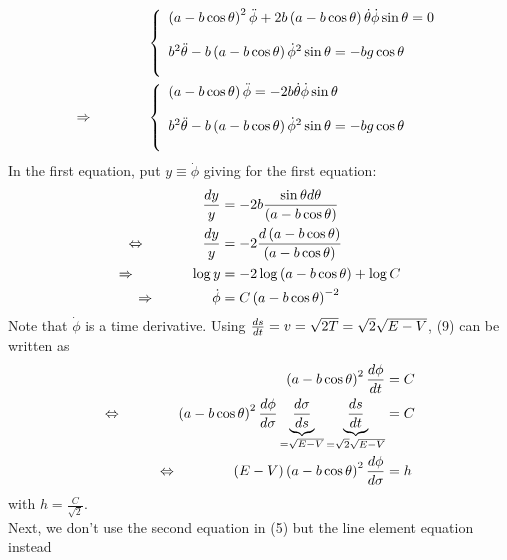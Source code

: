 \begin{align} 
&\left\{\begin{array}{l}
\left(a-b\cos \theta \right)^2   \ddot{\phi}+2b\left(a-b\cos \theta \right)\dot{\theta} \dot{\phi}\sin \theta  =0\\\\
b^2\ddot{\theta}-b\left(a-b\cos \theta \right)\dot{\phi}^2\sin \theta=-bg\cos{\theta}\\\\
\end{array}\right.\\
\Rightarrow\quad\quad\quad\quad &\left\{\begin{array}{l}
\left(a-b\cos \theta \right)   \ddot{\phi}=-2b\dot{\theta} \dot{\phi}\sin \theta  \\\\
b^2\ddot{\theta}-b\left(a-b\cos \theta \right)\dot{\phi}^2\sin \theta=-bg\cos{\theta}\\\\
\end{array}\right.
\end{align}
In the first equation, put $y \equiv \dot{\phi}$ giving for the first equation:
\begin{align}
\frac{dy}{y}&=-2b \frac{\sin \theta d\theta} {\left(a-b\cos \theta \right)}  \\
\Leftrightarrow\quad\quad\quad\quad\frac{dy}{y}&=-2 \frac{d\left(a-b\cos \theta \right)} {\left(a-b\cos \theta \right)}\\
\Rightarrow \quad\quad\quad\quad \log y&=-2 \log \left(a-b\cos \theta \right)+\log C^{}\\
\Rightarrow \quad\quad\quad\quad \dot{\phi}&= C \left(a-b\cos \theta \right)^{-2}
\end{align}
Note that $\dot{\phi}$ is a time derivative. Using  $\dv{s}{t}=v = \sqrt{2T} = \sqrt{2}\sqrt{E-V}$, (9) can be written as 
\begin{align}
\left(a-b\cos \theta \right)^{2}\dv{\phi}{t}&= C \\
\Leftrightarrow\quad\quad\quad\quad\left(a-b\cos \theta \right)^{2}\dv{\phi}{\sigma}\underbrace{\dv{\sigma}{s}}_{= \sqrt{E-V}}\underbrace{\dv{s}{t}}_{=\sqrt{2}\sqrt{E-V}}&= C \\
\Leftrightarrow\quad\quad\quad\quad \left(E-V\right)\left(a-b\cos \theta \right)^{2}\dv{\phi}{\sigma}(E-V)&= h
\end{align}
with $h=\frac{C}{\sqrt{2}}$.\\
Next, we don't use the second equation in (5) but the line element equation instead
